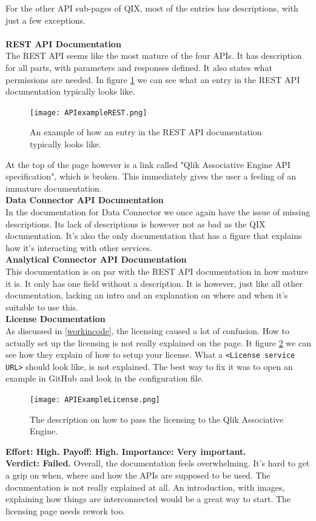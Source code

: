 \documentclass{cslthse-msc}
\begin{document}
    For the other API sub-pages of QIX, most of the entries has descriptions, with just a few exceptions.\\ \\
    \textbf{REST API Documentation}\\
    The REST API seems like the most mature of the four APIs. It has description for all parts, with parameters and responses defined. It also states what permissions are needed. In figure \ref{fig:RESTmethod} we can see what an entry in the REST API documentation typically looks like.
    \begin{figure}[H]
        \centering
        \texttt{[image: APIexampleREST.png]}
        \caption{An example of how an entry in the REST API documentation typically looks like.}
        \label{fig:RESTmethod}
    \end{figure}
    At the top of the page however is a link called "Qlik Associative Engine API specification", which is broken. This immediately gives the user a feeling of an immature documentation.
    \\
    \textbf{Data Connector API Documentation}\\
    In the documentation for Data Connector we once again have the issue of missing descriptions. Its lack of descriptions is however not as bad as the QIX documentation. It's also the only documentation that has a figure that explains how it's interacting with other services.\\
    \textbf{Analytical Connector API Documentation}\\
    This documentation is on par with the REST API documentation in how mature it is. It only has one field without a description. It is however, just like all other documentation, lacking an intro and an explanation on where and when it's suitable to use this.\\
    \textbf{License Documentation} \\
    As discussed in \ref{workincode}, the licensing caused a lot of confusion. How to actually set up the licensing is not really explained on the page. It figure \ref{fig:APIlicenese} we can see how they explain of how to setup your license. What a \texttt{<License service URL>} should look like, is not explained. The best way to fix it was to open an example in GitHub and look in the configuration file.\\
    \begin{figure}[H]
        \centering
        \texttt{[image: APIExampleLicense.png]}
        \caption{The description on how to pass the licensing to the Qlik Associative Engine.}
        \label{fig:APIlicenese}
    \end{figure}
    \textbf{Effort: High. Payoff: High. Importance: Very important.}\\
    \textbf{Verdict: Failed.} Overall, the documentation feels overwhelming. It's hard to get a grip on when, where and how the APIs are supposed to be used. The documentation is not really explained at all. An introduction, with images, explaining how things are interconnected would be a great way to start. The licensing page needs rework too.
\end{document}

